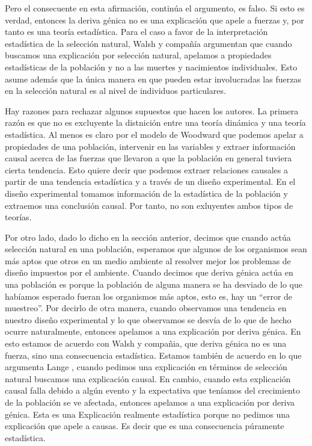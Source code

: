  Pero el consecuente en esta afirmación, continúa el argumento, es falso. Si esto es verdad, entonces la deriva génica no es una explicación que apele a fuerzas y, por tanto es una teoría estadística. Para el caso a favor de la interpretación estadística de la selección natural, Walsh y compañía argumentan que cuando buscamos una explicación por selección natural, apelamos a propiedades estadísticas de la población y no a las muertes y nacimientos individuales. Esto asume además que la única manera en que pueden estar involucradas las fuerzas en la selección natural es al nivel de individuos particulares.

 Hay razones para rechazar algunos supuestos que hacen los autores. La primera razón es que no es excluyente la distnición entre una teoría dinámica y una teoría estadística. Al menos es claro por el modelo de Woodward que podemos apelar a propiedades de una población, intervenir en las variables y extraer información causal acerca de las fuerzas que llevaron a que la población en general tuviera cierta tendencia. Esto quiere decir que podemos extraer relaciones causales a partir de una tendencia estadística y a través de un diseño experimental. En el diseño experimental tomamos información de la estadística de la población y extraemos una conclusión causal. Por tanto, no son exluyentes ambos tipos de teorías.

Por otro lado, dado lo dicho en la sección anterior, decimos que cuando actúa selección natural en una población, esperamos que algunos de los organismos sean más aptos que otros en un medio ambiente al resolver mejor los problemas de diseño impuestos por el ambiente. Cuando decimos que deriva génica actúa en una población es porque la población de alguna manera se ha desviado de lo que habíamos esperado fueran los organismos más aptos, esto es, hay un ``error de muestreo''. Por decirlo de otra manera, cuando observamos una tendencia en nuestro diseño experimental y lo que observamos se desvía de lo que de hecho ocurre naturalmente, entonces apelamos a una explicación por deriva génica. En esto estamos de acuerdo con Walsh y compañia, que deriva génica no es una fuerza, sino una consecuencia estadística. Estamos también de acuerdo en lo que argumenta Lange \citeyear{Lange2013}, cuando pedimos una explicación en términos de selección natural buscamos una explicación causal. En cambio, cuando esta explicación causal falla debido a algún evento y la expectativa que teníamos del crecimiento de la población se ve afectada, entonces apelamos a una explicación por deriva génica. Esta es una Explicación realmente estadística porque no pedimos una explicación que apele a causas. Es decir que es una consecuencia púramente estadística.

